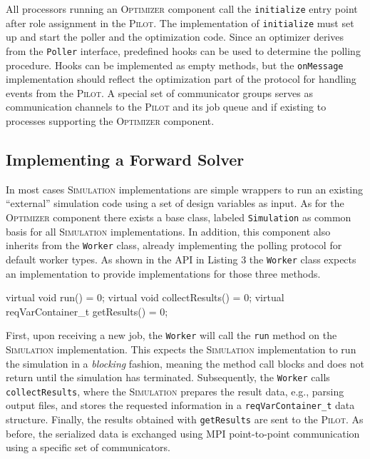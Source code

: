 \documentclass[%
reprint,
amsmath,amssymb,
aps,
prstab,
]{revtex4-1}
\begin{document}
All processors running an \textsc{Optimizer} component call the
  \texttt{initialize} entry point after role assignment in the
  \textsc{Pilot}.
The implementation of \texttt{initialize} must set up and start the poller and
  the optimization code.
Since an optimizer derives from the \texttt{Poller} interface, predefined
  hooks can be used to determine the polling procedure.
Hooks can be implemented as empty methods, but the \texttt{onMessage}
  implementation should reflect the optimization part of the protocol for
  handling events from the \textsc{Pilot}.
A special set of communicator groups serves as communication channels to the
  \textsc{Pilot} and its job queue and if existing to processes supporting the
  \textsc{Optimizer} component.


\subsection{Implementing a Forward Solver}

In most cases \textsc{Simulation} implementations are simple wrappers to run
  an existing ``external'' simulation code using a set of design variables as
  input.
As for the \textsc{Optimizer} component there exists a base class, labeled
  \texttt{Simulation} as common basis for all \textsc{Simulation}
  implementations.
In addition, this component also inherits from the \texttt{Worker} class,
  already implementing the polling protocol for default worker types.
As shown in the API in Listing 3 the \texttt{Worker} class expects an
  implementation to provide implementations for those three methods.

\begin{code}
virtual void run() = 0;
virtual void collectResults() = 0;
virtual reqVarContainer_t getResults() = 0;
\end{code}

First, upon receiving a new job, the \texttt{Worker} will call the
  \texttt{run} method on the \textsc{Simulation} implementation.
This expects the \textsc{Simulation} implementation to run the simulation in a
  \textit{blocking} fashion, meaning the method call blocks and does not return
  until the simulation has terminated.
Subsequently, the \texttt{Worker} calls \texttt{collectResults}, where the
  \textsc{Simulation} prepares the result data, e.g., parsing output files,
  and stores the requested information in a \texttt{reqVarContainer\_t} data
  structure.
Finally, the results obtained with \texttt{getResults} are sent to the
  \textsc{Pilot}.
As before, the serialized data is exchanged using MPI point-to-point
  communication using a specific set of communicators.
\end{document}

